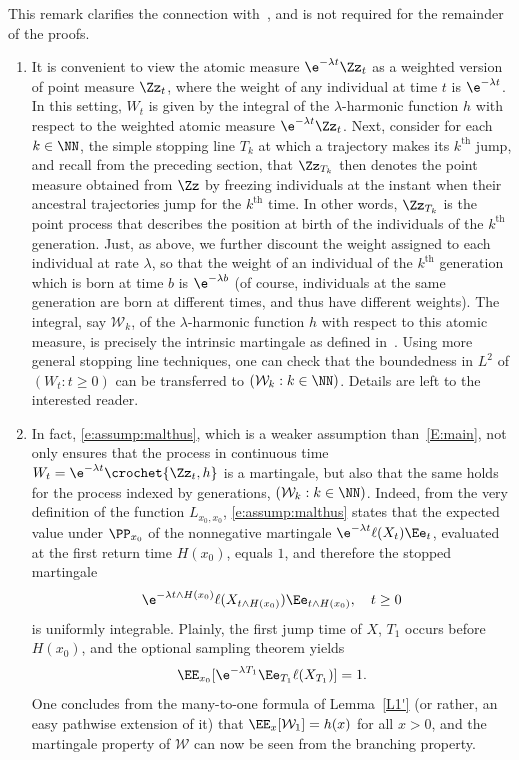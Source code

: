 \goodbreak
\begin{rema}
This remark clarifies the connection with~\cite{Jagers}, and is not required for the remainder of the proofs.
\begin{enumerate}
\item \label{list4.3.1}It is convenient to view the atomic measure $\e^{-\lambda t} \Zz_t$ as a weighted version of point measure $\Zz_t$, where the weight of any individual at time $t$ is $\e^{-\lambda t}$. In this setting, $W_t$ is given by the integral of the $\lambda$-harmonic function $h$ with respect to the weighted atomic measure $\e^{-\lambda t} \Zz_t$. Next, consider for each $k\in \NN$, the simple stopping line $T_k$ at which a trajectory makes its $k^{\text {th}}$ jump, and recall from the preceding section, that $\Zz_{T_k}$ then denotes the point measure obtained from $\Zz$ by freezing individuals at the instant when their ancestral trajectories jump for the $k^{\text{th}}$ time. In other words, $\Zz_{T_k}$ is the point process that describes the position at birth of the individuals of the $k^{\text{th}}$ generation. Just, as above, we further discount the weight assigned to each individual at rate $\lambda$, so that the weight of an individual of the $k^{\text{th}}$ generation which is born at time $b$ is $\e^{-\lambda b}$ (of course, individuals at the same generation are born at different times, and thus have different weights). The integral, say ${\mathcal W}_k$, of the $\lambda$-harmonic function $h$ with respect to this atomic measure, is precisely the intrinsic martingale as defined in~\cite{Jagers}. Using more general stopping line techniques, one can check that the boundedness in $L^2$ of $(W_t: t\geq 0)$ can be transferred to $({\mathcal W}_k: k\in\NN)$. Details are left to the interested reader.

\item \label{list4.3.2}In fact, \eqref{e:assump:malthus}, which is a weaker assumption than~\eqref{E:main}, not only ensures that the process in continuous time $W_t=\e^{-\lambda t} \crochet{\Zz_t, h}$ is a martingale, but also that the same holds for the process indexed by generations, $({\mathcal W}_k: k\in\NN)$. Indeed, from the very definition of the function $L_{x_0,x_0}$, \eqref{e:assump:malthus} states that the expected value under $\PP_{x_0}$ of the nonnegative martingale $\e^{-\lambda t} \ell(X_t) \Ee_t$, evaluated at the first return time $H(x_0)$, equals $1$, and therefore the stopped martingale
\[
\e^{-\lambda t\wedge H(x_0)} \ell(X_{t\wedge H(x_0)}) \Ee_{t\wedge H(x_0)}, \quad t\geq 0
\]
is uniformly integrable. Plainly, the first jump time of $X$, $T_1$ occurs before $H(x_0)$, and the optional sampling theorem yields
\[
\EE_{x_0}[\e^{-\lambda T_1} \Ee_{T_1} \ell(X_{T_1})]=1.
\]
One concludes from the many-to-one formula of Lemma~\ref{L1'} (or rather, an easy pathwise extension of it) that $\EE_{x}[{\mathcal W}_1]=h(x)$ for all $x>0$, and the martingale property of ${\mathcal W}$ can now be seen from the branching property.
\end{enumerate}
\end{rema}


